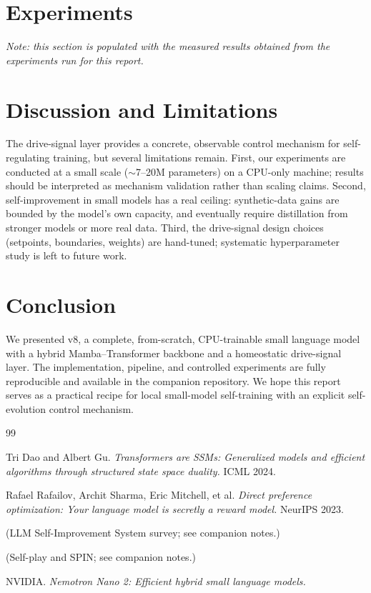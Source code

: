 \documentclass[11pt]{article}
\begin{document}
\section{Experiments}
\label{sec:experiments}

\emph{Note: this section is populated with the measured results obtained from
the experiments run for this report.}



\section{Discussion and Limitations}
\label{sec:discussion}

The drive-signal layer provides a concrete, observable control mechanism for
self-regulating training, but several limitations remain. First, our
experiments are conducted at a small scale ($\sim$7--20M parameters) on a
CPU-only machine; results should be interpreted as mechanism validation rather
than scaling claims. Second, self-improvement in small models has a real
ceiling: synthetic-data gains are bounded by the model's own capacity, and
eventually require distillation from stronger models or more real data. Third,
the drive-signal design choices (setpoints, boundaries, weights) are hand-tuned;
systematic hyperparameter study is left to future work.

\section{Conclusion}
\label{sec:conclusion}

We presented v8, a complete, from-scratch, CPU-trainable small language model
with a hybrid Mamba--Transformer backbone and a homeostatic drive-signal layer.
The implementation, pipeline, and controlled experiments are fully reproducible
and available in the companion repository. We hope this report serves as a
practical recipe for local small-model self-training with an explicit
self-evolution control mechanism.

\begin{thebibliography}{99}

 Tri Dao and Albert Gu.
\emph{Transformers are SSMs: Generalized models and efficient algorithms through
structured state space duality.} ICML 2024.

 Rafael Rafailov, Archit Sharma, Eric Mitchell, et al.
\emph{Direct preference optimization: Your language model is secretly a reward
model.} NeurIPS 2023.

 (LLM Self-Improvement System survey; see companion notes.)

 (Self-play and SPIN; see companion notes.)

 NVIDIA.
\emph{Nemotron Nano 2: Efficient hybrid small language models.}

\end{thebibliography}
\end{document}
